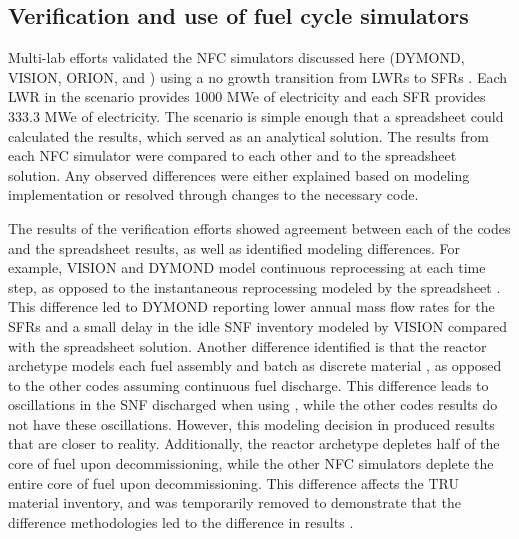\subsection{Verification and use of fuel cycle simulators}
Multi-lab efforts validated the \gls{NFC} simulators discussed here 
(\gls{DYMOND}, \gls{VISION}, ORION, and \Cyclus)
using a no growth transition from \glspl{LWR} 
to \glspl{SFR} \cite{feng_sensitivity_2020,bae_standardized_2019}.
Each \gls{LWR} in the scenario provides 1000 MWe of 
electricity and each \gls{SFR} provides 333.3 MWe of electricity. The 
scenario is simple enough that a spreadsheet could calculated the results, 
which served as an analytical solution. The 
results from each \gls{NFC} simulator were compared to each other and 
to the spreadsheet solution. Any observed differences were either explained 
based on modeling implementation or resolved through changes to the 
necessary code.

The results of the verification efforts showed agreement between each 
of the codes and the spreadsheet results, as well as identified modeling 
differences. For example, \gls{VISION} and \gls{DYMOND} model continuous 
reprocessing at each time step, as opposed to the instantaneous 
reprocessing modeled by the spreadsheet \cite{feng_standardized_2016}. 
This difference led to \gls{DYMOND} reporting lower annual mass flow 
rates for the \glspl{SFR} and a small delay in the idle \gls{SNF} 
inventory modeled by \gls{VISION} compared with the spreadsheet 
solution. 
Another difference identified is that the \Cycamore reactor 
archetype models each fuel assembly and batch as discrete material 
\cite{bae_standardized_2019}, as 
opposed to the other codes assuming continuous fuel discharge. 
This difference leads to oscillations in the \gls{SNF} discharged 
when using \Cyclus, while the other codes results do not have these 
oscillations.
However, this modeling decision in \Cyclus produced results that 
are closer to reality. 
Additionally, the \Cycamore reactor archetype depletes half of the 
core of fuel upon decommissioning, while the other \gls{NFC} simulators 
deplete the entire core of fuel upon decommissioning. This 
difference affects the \gls{TRU} material inventory, and was 
temporarily removed to demonstrate that the difference 
methodologies led to the difference in results \cite{bae_standardized_2019}.

